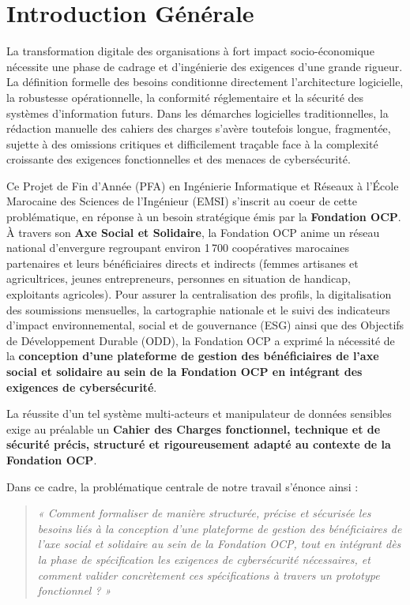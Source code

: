 \chapter*{Introduction Générale}
\setcounter{page}{1}

La transformation digitale des organisations à fort impact socio-économique nécessite une phase de cadrage et d'ingénierie des exigences d'une grande rigueur. La définition formelle des besoins conditionne directement l'architecture logicielle, la robustesse opérationnelle, la conformité réglementaire et la sécurité des systèmes d'information futurs. Dans les démarches logicielles traditionnelles, la rédaction manuelle des cahiers des charges s'avère toutefois longue, fragmentée, sujette à des omissions critiques et difficilement traçable face à la complexité croissante des exigences fonctionnelles et des menaces de cybersécurité.

Ce Projet de Fin d'Année (PFA) en Ingénierie Informatique et Réseaux à l'École Marocaine des Sciences de l'Ingénieur (EMSI) s'inscrit au coeur de cette problématique, en réponse à un besoin stratégique émis par la \textbf{Fondation OCP}. À travers son \textbf{Axe Social et Solidaire}, la Fondation OCP anime un réseau national d'envergure regroupant environ 1\,700 coopératives marocaines partenaires et leurs bénéficiaires directs et indirects (femmes artisanes et agricultrices, jeunes entrepreneurs, personnes en situation de handicap, exploitants agricoles). Pour assurer la centralisation des profils, la digitalisation des soumissions mensuelles, la cartographie nationale et le suivi des indicateurs d'impact environnemental, social et de gouvernance (ESG) ainsi que des Objectifs de Développement Durable (ODD), la Fondation OCP a exprimé la nécessité de la \textbf{conception d'une plateforme de gestion des bénéficiaires de l'axe social et solidaire au sein de la Fondation OCP en intégrant des exigences de cybersécurité}.

La réussite d'un tel système multi-acteurs et manipulateur de données sensibles exige au préalable un \textbf{Cahier des Charges fonctionnel, technique et de sécurité précis, structuré et rigoureusement adapté au contexte de la Fondation OCP}.

Dans ce cadre, la problématique centrale de notre travail s'énonce ainsi :
\begin{quote}
\textit{« Comment formaliser de manière structurée, précise et sécurisée les besoins liés à la conception d'une plateforme de gestion des bénéficiaires de l'axe social et solidaire au sein de la Fondation OCP, tout en intégrant dès la phase de spécification les exigences de cybersécurité nécessaires, et comment valider concrètement ces spécifications à travers un prototype fonctionnel ? »}
\end{quote}


